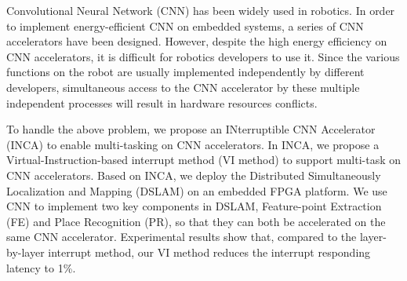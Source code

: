 Convolutional Neural Network (CNN) has been widely used in robotics.
In order to implement energy-efficient CNN on embedded systems, a series of CNN accelerators have been designed. However, despite the high energy efficiency on CNN accelerators, it is difficult for robotics developers to use it. Since the various functions on the robot are usually implemented independently by different developers, simultaneous access to the CNN accelerator by these multiple independent processes will result in hardware resources conflicts.

To handle the above problem, we propose an INterruptible CNN Accelerator (INCA) to enable multi-tasking on CNN accelerators. In INCA, we propose a Virtual-Instruction-based interrupt method (VI method) to support multi-task on CNN accelerators. Based on INCA, we deploy the Distributed Simultaneously Localization and Mapping (DSLAM) on an embedded FPGA platform. We use CNN to implement two key components in DSLAM, Feature-point Extraction (FE) and Place Recognition (PR), so that they can both be accelerated on the same CNN accelerator. Experimental results show that, compared to the layer-by-layer interrupt method, our VI method reduces the interrupt responding latency to 1\%.